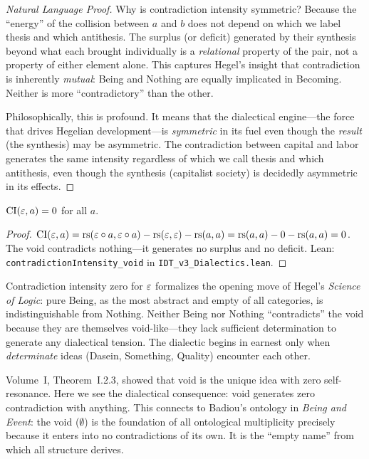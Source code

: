 \begin{proof}[Natural Language Proof]
Why is contradiction intensity symmetric? Because the ``energy'' of the
collision between $a$ and $b$ does not depend on which we label thesis and
which antithesis. The surplus (or deficit) generated by their synthesis
beyond what each brought individually is a \emph{relational} property of the
pair, not a property of either element alone. This captures Hegel's insight
that contradiction is inherently \emph{mutual}: Being and Nothing are equally
implicated in Becoming. Neither is more ``contradictory'' than the other.

Philosophically, this is profound. It means that the dialectical engine---the
force that drives Hegelian development---is \emph{symmetric} in its fuel even
though the \emph{result} (the synthesis) may be asymmetric. The contradiction
between capital and labor generates the same intensity regardless of which we
call thesis and which antithesis, even though the synthesis (capitalist society)
is decidedly asymmetric in its effects.
\end{proof}

\begin{theorem}
\label{thm:contradiction-void}
$\mathrm{CI}(\varepsilon, a) = 0$ for all $a$.
\end{theorem}

\begin{proof}
$\mathrm{CI}(\varepsilon, a) = \mathrm{rs}(\varepsilon \circ a, \varepsilon \circ a) - \mathrm{rs}(\varepsilon, \varepsilon) -
\mathrm{rs}(a, a) = \mathrm{rs}(a, a) - 0 - \mathrm{rs}(a, a) = 0$. The void contradicts nothing---it
generates no surplus and no deficit. Lean: \texttt{contradictionIntensity\_void}
in \texttt{IDT\_v3\_Dialectics.lean}.
\end{proof}

\begin{interpretation}
Contradiction intensity zero for $\varepsilon$ formalizes the opening move of Hegel's
\textit{Science of Logic}: pure Being, as the most abstract and empty of all
categories, is indistinguishable from Nothing. Neither Being nor Nothing
``contradicts'' the void because they are themselves void-like---they lack
sufficient determination to generate any dialectical tension. The dialectic
begins in earnest only when \emph{determinate} ideas (Dasein, Something,
Quality) encounter each other.

Volume~I, Theorem~I.2.3, showed that void is the unique idea with zero
self-resonance. Here we see the dialectical consequence: void generates
zero contradiction with anything. This connects to Badiou's ontology in
\textit{Being and Event}: the void ($\emptyset$) is the foundation of all
ontological multiplicity precisely because it enters into no contradictions
of its own. It is the ``empty name'' from which all structure derives.
\end{interpretation}

